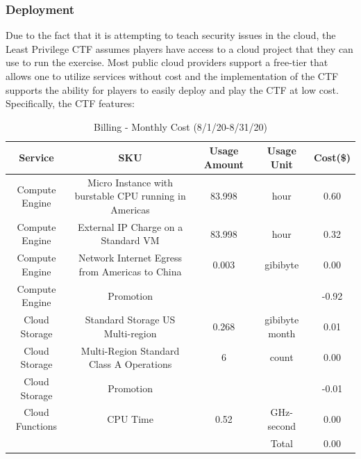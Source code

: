 \subsubsection{Deployment}
Due to the fact that it is attempting to teach security issues in the cloud,
the Least Privilege CTF assumes players have access to a cloud project that they can use to run
the exercise.  Most public cloud providers support a free-tier that allows one to utilize services without cost and the implementation
of the CTF supports the ability for players to easily deploy and play the CTF at low cost.   Specifically, the CTF features:
\begin{table}[t]
\centering
 \caption{Billing - Monthly Cost (8/1/20-8/31/20)}
    \label{table:cost} 
    \begin{tabular}{|c|c|c|c|c|}
    \hline
    Service & SKU & Usage Amount & Usage Unit & Cost(\$) \\
    \hline
    \hline
    Compute Engine &Micro Instance with burstable CPU running in Americas& 83.998 & hour & 0.60\\ %
    \hline
    Compute Engine &External IP Charge on a Standard VM& 83.998 & hour & 0.32\\ %
    \hline
    Compute Engine &Network Internet Egress from Americas to China& 0.003 & gibibyte & 0.00\\ %
    \hline
     Compute Engine &Promotion&  &  & -0.92\\ %
    \hline
     Cloud Storage &Standard Storage US Multi-region& 0.268 & gibibyte month & 0.01\\ %
    \hline
     Cloud Storage &Multi-Region Standard Class A Operations& 6 & count & 0.00\\ %
    \hline
     Cloud Storage  &Promotion&  &  & -0.01\\ %
    \hline
     Cloud Functions &CPU Time& 0.52 & GHz-second & 0.00\\ %
    \hline
    \hline
      & & & Total & 0.00\\ %
    \hline
    \end{tabular}
\end{table}









